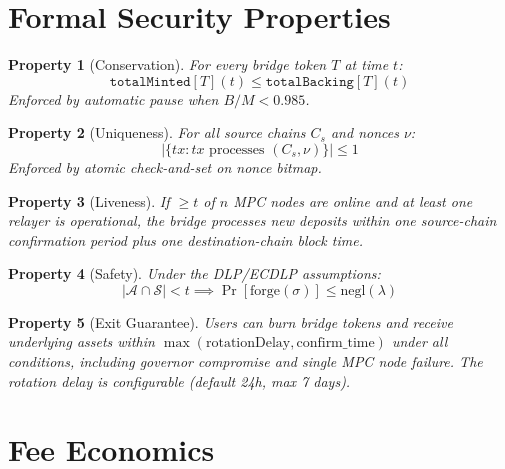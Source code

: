 \documentclass[11pt]{article}
\newtheorem{property}{Property}
\begin{document}
\section{Formal Security Properties}
\label{sec:security}

\begin{property}[Conservation]
For every bridge token $T$ at time $t$:
\begin{equation}
  \texttt{totalMinted}[T](t) \leq \texttt{totalBacking}[T](t)
\end{equation}
Enforced by automatic pause when $B / M < 0.985$.
\end{property}

\begin{property}[Uniqueness]
For all source chains $C_s$ and nonces $\nu$:
\begin{equation}
  \bigl|\{tx : tx \text{ processes } (C_s, \nu)\}\bigr| \leq 1
\end{equation}
Enforced by atomic check-and-set on nonce bitmap.
\end{property}

\begin{property}[Liveness]
If $\geq t$ of $n$ MPC nodes are online and at least one relayer is operational, the bridge processes new deposits within one source-chain confirmation period plus one destination-chain block time.
\end{property}

\begin{property}[Safety]
Under the DLP/ECDLP assumptions:
\begin{equation}
  |\mathcal{A} \cap \mathcal{S}| < t \implies \Pr[\text{forge}(\sigma)] \leq \text{negl}(\lambda)
\end{equation}
\end{property}

\begin{property}[Exit Guarantee]
Users can burn bridge tokens and receive underlying assets within $\max(\text{rotationDelay}, \text{confirm\_time})$ under all conditions, including governor compromise and single MPC node failure. The rotation delay is configurable (default 24h, max 7 days).
\end{property}

\section{Fee Economics}
\label{sec:economics}
\end{document}
